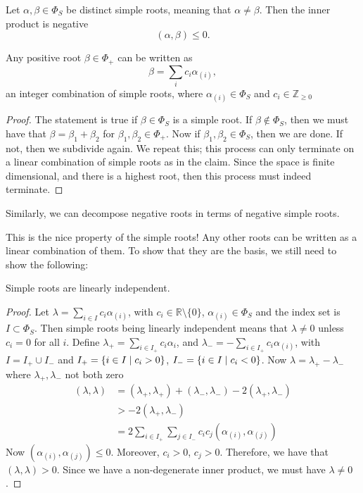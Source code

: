 \begin{claim}
  \label{cl:19-iii}
  Let $\alpha, \beta \in \Phi_S$ be distinct simple roots, meaning that $\alpha \neq \beta$. Then the inner product is negative
  \begin{equation}
    (\alpha, \beta) \leq 0.
  \end{equation}
\end{claim}
\begin{claim}
  \label{cl:19-4}
  Any positive root $\beta \in \Phi_+$ can be written as
  \begin{equation}
    \beta = \sum_i c_i \alpha_{(i)},
  \end{equation}
  an integer combination of simple roots, where $\alpha_{(i)} \in \Phi_S$ and $c_{i} \in \mathbb{Z}_{\geq 0}$
\end{claim}
\begin{proof}
  The statement is true if $\beta \in \Phi_S$ is a simple root.
  If $\beta \not \in \Phi_S$, then we must have that  $\beta = \beta_1 + \beta_2$ for $\beta_1, \beta_2 \in \Phi_+$.
  Now if $\beta_1, \beta_2 \in \Phi_S$, then we are done. If not, then we subdivide again. We repeat this; this process can only terminate on a linear combination of simple roots as in the claim. Since the space is finite dimensional, and there is a highest root, then this process must indeed terminate.
\end{proof}

\begin{remark}
  Similarly, we can decompose negative roots in terms of negative simple roots.
\end{remark}
This is the nice property of the simple roots! Any other roots can be written as a linear combination of them.
To show that they are the basis, we still need to show the following:
\begin{claim}
  \label{cl:19-5}
  Simple roots are linearly independent.
\end{claim}
\begin{proof}
  Let $\lambda = \sum_{i \in I} c_{i} \alpha_{(i)}$, with $c_{i} \in \mathbb{R}\setminus{\{0\}}$, $\alpha_{(i)} \in \Phi_S$ and the index set is $I \subset \Phi_S$.
  Then simple roots being linearly independent means that $\lambda \neq 0$ unless $c_{i} = 0$ for all $i$.
  Define $\lambda_+ = \sum_{i\in I_+} c_{i} \alpha_{i}$, and $\lambda_- = -\sum_{i \in I_+} c_{i} \alpha_{(i)}$, with $I = I_+ \cup I_-$ and $I_+ = \left\{ i \in I \suchthat c_{i} > 0 \right\}$, $I_- = \left\{ i \in I \suchthat c_i < 0 \right\}$.
  Now $\lambda = \lambda_+ - \lambda_-$ where $\lambda_+, \lambda_-$ not both zero
  \begin{align}
    (\lambda, \lambda) &= (\lambda_+, \lambda_+) + (\lambda_-, \lambda_-) - 2(\lambda_+, \lambda_-) \\
		       &> -2 (\lambda_+, \lambda_-) \\
		       &= 2 \sum_{i\in I_+} \sum_{j \in I_-} c_{i} c_{j} (\alpha_{(i)}, \alpha_{(j)})
  \end{align}
  Now $(\alpha_{(i)}, \alpha_{(j)}) \leq 0$. Moreover, $c_{i} > 0$, $c_{j} > 0$. Therefore, we have that $(\lambda, \lambda) > 0$. Since we have a non-degenerate inner product, we must have $\lambda \neq 0$.
\end{proof}

